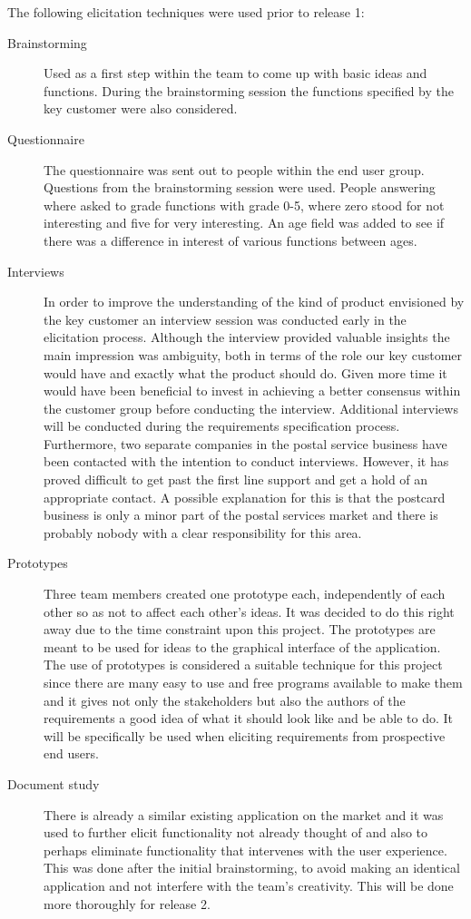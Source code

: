 \documentclass[10pt,a4paper]{article}
\begin{document}
The following elicitation techniques were used prior to release 1:
\begin{description}
\item[Brainstorming] Used as a first step within the team to come up with basic ideas and functions. During the brainstorming session the functions specified by the key customer were also considered.

\item[Questionnaire] The questionnaire was sent out to people within the end user group. Questions from the brainstorming session were used. People answering where asked to grade functions with grade 0-5, where zero stood for not interesting and five for very interesting. An age field was added to see if there was a difference in interest of various functions between ages. 

\item[Interviews] In order to improve the understanding of the kind of product envisioned by the key customer an interview session was conducted early in the elicitation process. Although the interview provided valuable insights the main impression was  ambiguity, both in terms of the role our key customer would have and exactly what the product should do. Given more time it would have been beneficial to invest in achieving a better consensus within the customer group before conducting the interview. Additional interviews will be conducted during the requirements specification process.
Furthermore, two separate companies in the postal service business have been contacted with the intention to conduct interviews. However, it has proved difficult to get past the first line support and get a hold of an appropriate contact. A possible explanation for this is that the postcard business is only a minor part of the postal services market and there is probably nobody with a clear responsibility for this area.  

\item[Prototypes] Three team members created one prototype each, independently of each other so as not to affect each other's ideas. It was decided to do this right away due to the time constraint upon this project. The prototypes are meant to be used for ideas to the graphical interface of the application. The use of prototypes is considered a suitable technique for this project since there are many easy to use and free programs available to make them and it gives not only the stakeholders but also the authors of the requirements a good idea of what it should look like and be able to do. It will be specifically be used when eliciting requirements from prospective end users.

\item[Document study] There is already a similar existing application on the market and it was used to further elicit functionality not already thought of and also to perhaps eliminate functionality that intervenes with the user experience. This was done after the initial brainstorming, to avoid making an identical application and not interfere with the team's creativity. This will be done more thoroughly for release 2.

\end{description}
\end{document}
